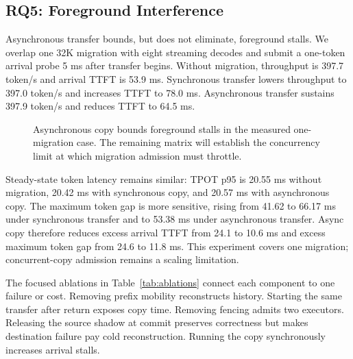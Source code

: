 \subsection{RQ5: Foreground Interference}\label{rq5-foreground-interference}

Asynchronous transfer bounds, but does not eliminate, foreground stalls. We overlap one 32K migration with eight streaming decodes and submit a one-token arrival probe 5 ms after transfer begins. Without migration, throughput is 397.7 token/s and arrival TTFT is 53.9 ms. Synchronous transfer lowers throughput to 397.0 token/s and increases TTFT to 78.0 ms. Asynchronous transfer sustains 397.9 token/s and reduces TTFT to 64.5 ms.

\begin{figure}[t]
  \centering
  \caption{Asynchronous copy bounds foreground stalls in the measured one-migration case. The remaining matrix will establish the concurrency limit at which migration admission must throttle.}
  \label{fig:interference}
\end{figure}

Steady-state token latency remains similar: TPOT p95 is 20.55 ms without migration, 20.42 ms with synchronous copy, and 20.57 ms with asynchronous copy. The maximum token gap is more sensitive, rising from 41.62 to 66.17 ms under synchronous transfer and to 53.38 ms under asynchronous transfer. Async copy therefore reduces excess arrival TTFT from 24.1 to 10.6 ms and excess maximum token gap from 24.6 to 11.8 ms. This experiment covers one migration; concurrent-copy admission remains a scaling limitation.

The focused ablations in Table~\ref{tab:ablations} connect each component to one failure or cost. Removing prefix mobility reconstructs history. Starting the same transfer after return exposes copy time. Removing fencing admits two executors. Releasing the source shadow at commit preserves correctness but makes destination failure pay cold reconstruction. Running the copy synchronously increases arrival stalls.

